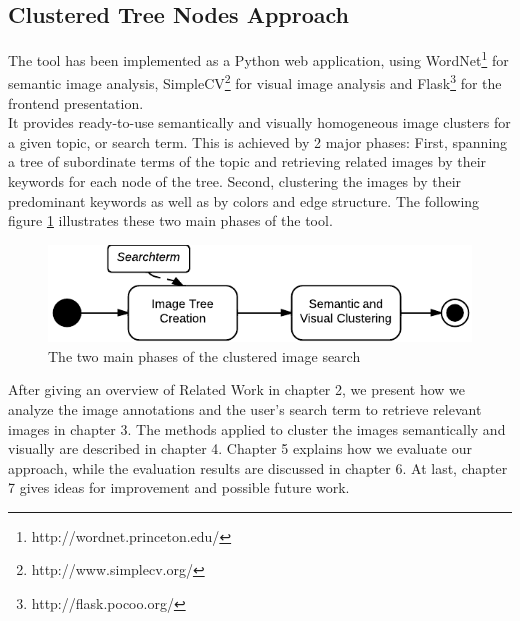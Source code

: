 \subsection{Clustered Tree Nodes Approach}
The tool has been implemented as a Python web application, using WordNet\footnote{http://wordnet.princeton.edu/} for semantic image analysis, SimpleCV\footnote{http://www.simplecv.org/} for visual image analysis and Flask\footnote{http://flask.pocoo.org/} for the frontend presentation.\\
It provides ready-to-use semantically and visually homogeneous image clusters for a given topic, or search term. This is achieved by 2 major phases: First, spanning a tree of subordinate terms of the topic and retrieving related images by their keywords for each node of the tree. Second, clustering the images by their predominant keywords as well as by colors and edge structure. The following figure \ref{fig_overallprocess} illustrates these two main phases of the tool.

\begin{figure}[h]
\centering
\includegraphics[]{images/search_process_highlevel.pdf}
\caption{The two main phases of the clustered image search}
\label{fig_overallprocess}
\end{figure}

\bigskip

After giving an overview of Related Work in chapter 2, we present how we analyze the image annotations and the user's search term to retrieve relevant images in chapter 3. The methods applied to cluster the images semantically and visually are described in chapter 4. Chapter 5 explains how we evaluate our approach, while the evaluation results are discussed in chapter 6. At last, chapter 7 gives ideas for improvement and possible future work.
